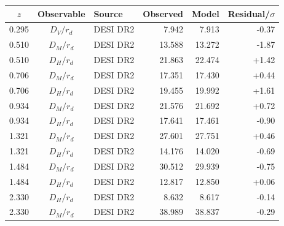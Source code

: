 \begin{tabular}{cclrrr}
\toprule
$z$ & Observable & Source & Observed & Model & Residual/$\sigma$ \\
\midrule
0.295 & $D_V/r_d$ & DESI DR2 & 7.942 & 7.913 & -0.37 \\
0.510 & $D_M/r_d$ & DESI DR2 & 13.588 & 13.272 & -1.87 \\
0.510 & $D_H/r_d$ & DESI DR2 & 21.863 & 22.474 & +1.42 \\
0.706 & $D_M/r_d$ & DESI DR2 & 17.351 & 17.430 & +0.44 \\
0.706 & $D_H/r_d$ & DESI DR2 & 19.455 & 19.992 & +1.61 \\
0.934 & $D_M/r_d$ & DESI DR2 & 21.576 & 21.692 & +0.72 \\
0.934 & $D_H/r_d$ & DESI DR2 & 17.641 & 17.461 & -0.90 \\
1.321 & $D_M/r_d$ & DESI DR2 & 27.601 & 27.751 & +0.46 \\
1.321 & $D_H/r_d$ & DESI DR2 & 14.176 & 14.020 & -0.69 \\
1.484 & $D_M/r_d$ & DESI DR2 & 30.512 & 29.939 & -0.75 \\
1.484 & $D_H/r_d$ & DESI DR2 & 12.817 & 12.850 & +0.06 \\
2.330 & $D_H/r_d$ & DESI DR2 & 8.632 & 8.617 & -0.14 \\
2.330 & $D_M/r_d$ & DESI DR2 & 38.989 & 38.837 & -0.29 \\
\bottomrule
\end{tabular}